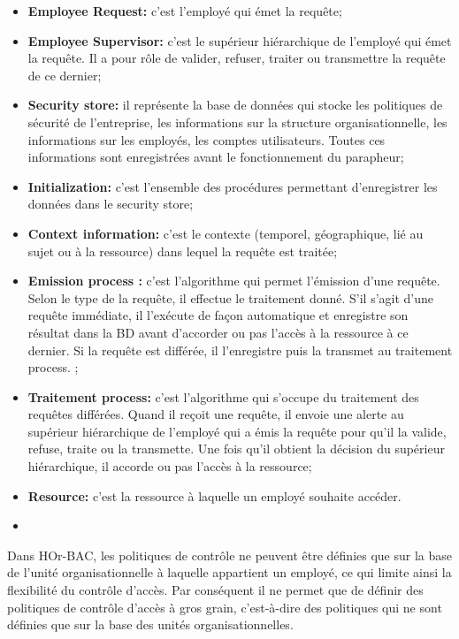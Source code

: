 \begin{itemize}
\item \textbf{Employee Request:} c'est l'employé qui émet la requête;
\item \textbf{Employee Supervisor:} c'est le supérieur hiérarchique de l'employé qui émet la requête. Il a pour rôle de valider, refuser, traiter ou transmettre la requête de ce dernier;
\item \textbf{Security store:} il représente la base de données qui stocke les politiques de sécurité de l'entreprise, les informations sur la structure organisationnelle, les informations sur les employés, les comptes utilisateurs. Toutes ces informations sont enregistrées avant le fonctionnement du parapheur;
\item \textbf{Initialization:} c'est l'ensemble des procédures permettant d'enregistrer les données dans le security store;
\item \textbf{Context information:} c'est le contexte (temporel, géographique, lié au sujet ou à la ressource) dans lequel la requête est traitée;
\item \textbf{Emission process :} c'est l'algorithme qui permet l'émission d'une requête. Selon le type de la requête, il effectue le traitement donné. S'il s'agit d'une requête immédiate, il l'exécute de façon automatique et enregistre son résultat dans la BD avant d'accorder ou pas l'accès à la ressource à ce dernier. Si la requête est différée, il l'enregistre puis la transmet au traitement process.
;
\item \textbf{Traitement process:} c'est l'algorithme qui s'occupe du traitement des requêtes différées. Quand il reçoit une requête, il envoie une alerte au supérieur hiérarchique de l'employé qui a émis la requête pour qu'il la valide, refuse, traite ou la transmette. Une fois qu'il obtient la décision du supérieur hiérarchique, il accorde ou pas l'accès à la ressource;
\item \textbf{Resource:} c'est la ressource à laquelle un employé souhaite accéder.
\item
\end{itemize}

\label{sectionInconveniantHOr-BAC}

Dans HOr-BAC, les politiques de contrôle ne peuvent être définies que sur la base de l'unité organisationnelle à laquelle appartient un employé, ce qui limite ainsi la flexibilité du contrôle d'accès. Par conséquent il ne permet que de définir des politiques de contrôle d'accès à gros grain, c'est-à-dire des politiques qui ne sont définies que sur la base des unités organisationnelles. 


